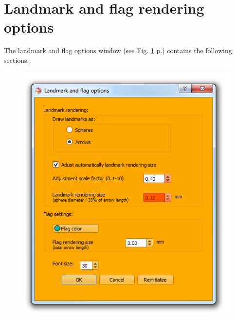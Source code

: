 \noindent



\section{Landmark and flag rendering options}


The landmark and flag options window (see Fig. \ref{landmarks_flags_options} p.\pageref{landmarks_flags_options}) contains the following sections:
\begin{figure}
  \centering  
 \includegraphics[scale=0.5]{images/08/landmark_flag_options.png}
\label{landmarks_flags_options}
\end{figure}

